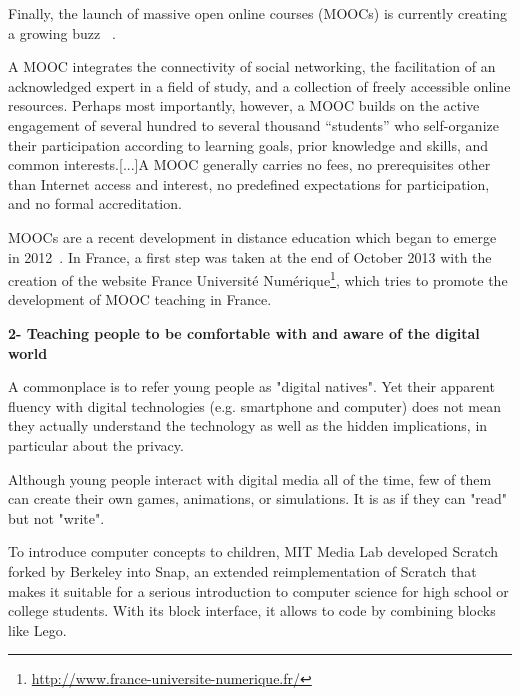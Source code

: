 Finally, the launch of massive open online courses (MOOCs) is currently creating a growing buzz ~\parencite{mackness2010ideals}.

\begin{formal}
    A MOOC integrates the connectivity of social networking, the facilitation of an acknowledged expert in a field of study, and a collection of freely accessible online resources. Perhaps most importantly, however, a MOOC builds on the active engagement of several hundred to several thousand “students” who self-organize their participation according to learning goals, prior knowledge and skills, and common interests.[...]A MOOC generally carries no fees, no prerequisites other than Internet access and interest, no predefined expectations for participation, and no formal accreditation.

\end{formal}

MOOCs are a recent development in distance education which began to emerge in 2012~\parencite{pappano2012year}. In France, a first step was taken at the end of October 2013 with the creation of the website France Université Numérique\footnote{\url{http://www.france-universite-numerique.fr/}}, which tries to promote the development of MOOC teaching in France.


\textbf{2- Teaching people to be comfortable with and aware of the digital world}

A commonplace is to refer young people as "digital natives". Yet their apparent fluency with digital technologies (e.g. smartphone and computer) does not mean they actually understand the technology as well as the hidden implications, in particular about the privacy.

\begin{formal}
    Although young people interact with digital media all of the time, few of them can create their own games, animations, or simulations. It is as if they can "read" but not "write".

\end{formal}

To introduce computer concepts to children, MIT Media Lab developed Scratch~\parencite{resnick2009scratch} forked by Berkeley into Snap, an extended reimplementation of Scratch that makes it suitable for a serious introduction to computer science for high school or college students. With its block interface, it allows to code by combining blocks like Lego.

